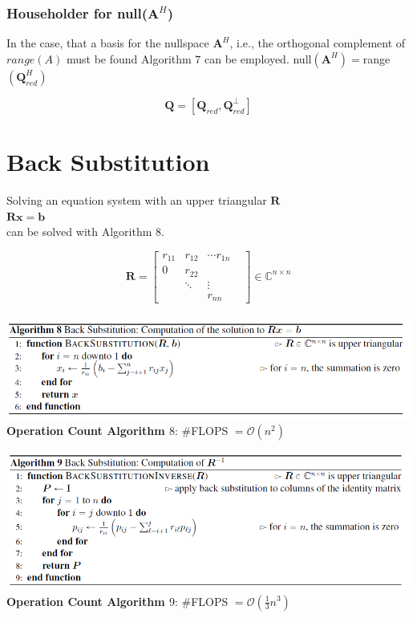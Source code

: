 \documentclass[english]{latex4ei/latex4ei_sheet}
\begin{document}
\begin{sectionbox}
	\subsubsection{Householder for null($\mathbf{A}^H$)}
	
In the case, that a basis for the nullspace $\mathbf{A}^H$, i.e., the orthogonal complement of $range(A)$ must be found Algorithm $7$ can be employed. null$(\mathbf{A}^H)=$range$(\mathbf{Q}_{red}^H)$

$$\mathbf{Q} = [\mathbf{Q}_{red}, \mathbf{Q}_{red}^\perp]$$

\end{sectionbox}
\section{Back Substitution}
\begin{sectionbox}
Solving an equation system with an upper triangular $\mathbf{R}$\\
$\mathbf{R}\mathbf{x} = \mathbf{b}$\\
can be solved with Algorithm $8$.


$$\mathbf{R}= \begin{bmatrix}
r_{11} & r_{12} & \cdots r_{1n} \\
0 & r_{22} &\\
& \ddots & \vdots\\
& & r_{nn} & 
\end{bmatrix}\in\mathbb{C}^{n\times n}$$\\

\includegraphics[width=\textwidth]{img/algo8_backsub.png}\\
\textbf{Operation Count Algorithm $8$}: \#FLOPS $=\mathcal{O}(n^2)$\\
\end{sectionbox}

\begin{sectionbox}
\includegraphics[width=\textwidth]{img/algo9_R_inverse.png}\\
\textbf{Operation Count Algorithm $9$}: \#FLOPS $=\mathcal{O}(\frac{1}{3}n^3)$\\
\end{sectionbox}
\end{document}
